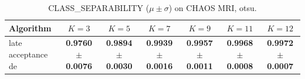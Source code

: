 \begin{table}[htbp]
\centering
\caption{CLASS_SEPARABILITY ($\mu \pm \sigma$) on CHAOS MRI, otsu.}
\label{tab:exp2-otsu-class_separability}
\begin{tabular}{lcccccc}
\toprule
Algorithm & $K=3$ & $K=5$ & $K=7$ & $K=9$ & $K=11$ & $K=12$ \\
\midrule
late acceptance de & \textbf{0.9760 $\pm$ 0.0076} & \textbf{0.9894 $\pm$ 0.0030} & \textbf{0.9939 $\pm$ 0.0016} & \textbf{0.9957 $\pm$ 0.0011} & \textbf{0.9968 $\pm$ 0.0008} & \textbf{0.9972 $\pm$ 0.0007} \\
\bottomrule
\end{tabular}
\end{table}